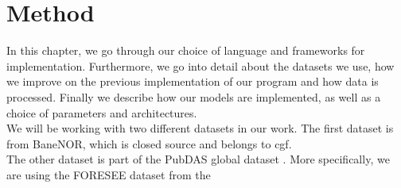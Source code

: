 \chapter{Method}
\label{chap:method}

In this chapter, we go through our choice of language and frameworks for implementation. Furthermore, we go into detail about the datasets we use, how we improve on the previous implementation of our program and how data is processed. Finally we describe how our models are implemented, as well as a choice of parameters and architectures. \\

We will be working with two different datasets in our work. The first dataset is from BaneNOR, which is closed source and belongs to \acrfull{cgf}. \\ 

The other dataset is part of the PubDAS global dataset \cite{spica2023pubdas}. More specifically, we are using the FORESEE dataset from the 







